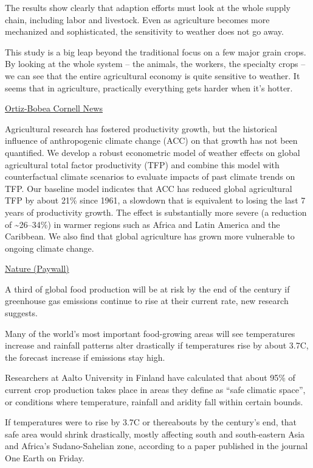 \documentclass[
]{book}
\begin{document}
The results show clearly that adaption efforts must look at the whole supply chain, including labor and livestock.
Even as agriculture becomes more mechanized and sophisticated, the sensitivity to weather does not go away.

This study is a big leap beyond the traditional focus on a few major grain crops.
By looking at the whole system -- the animals, the workers, the specialty crops -- we can see that the entire agricultural economy is quite sensitive to weather. It seems that in agriculture, practically everything gets harder when it's hotter.

\href{https://news.cornell.edu/stories/2021/04/climate-change-has-cost-7-years-ag-productivity-growth}{Ortiz-Bobea Cornell News}

Agricultural research has fostered productivity growth, but the historical influence of anthropogenic climate change (ACC) on that growth has not been quantified. We develop a robust econometric model of weather effects on global agricultural total factor productivity (TFP) and combine this model with counterfactual climate scenarios to evaluate impacts of past climate trends on TFP. Our baseline model indicates that ACC has reduced global agricultural TFP by about 21\% since 1961, a slowdown that is equivalent to losing the last 7 years of productivity growth. The effect is substantially more severe (a reduction of \textasciitilde26--34\%) in warmer regions such as Africa and Latin America and the Caribbean. We also find that global agriculture has grown more vulnerable to ongoing climate change.

\href{https://www.nature.com/articles/s41558-021-01000-1}{Nature (Paywall)}

A third of global food production will be at risk by the end of the century if greenhouse gas emissions continue to rise at their current rate, new research suggests.

Many of the world's most important food-growing areas will see temperatures increase and rainfall patterns alter drastically if temperatures rise by about 3.7C, the forecast increase if emissions stay high.

Researchers at Aalto University in Finland have calculated that about 95\% of current crop production takes place in areas they define as ``safe climatic space'', or conditions where temperature, rainfall and aridity fall within certain bounds.

If temperatures were to rise by 3.7C or thereabouts by the century's end, that safe area would shrink drastically, mostly affecting south and south-eastern Asia and Africa's Sudano-Sahelian zone, according to a paper published in the journal One Earth on Friday.
\end{document}
